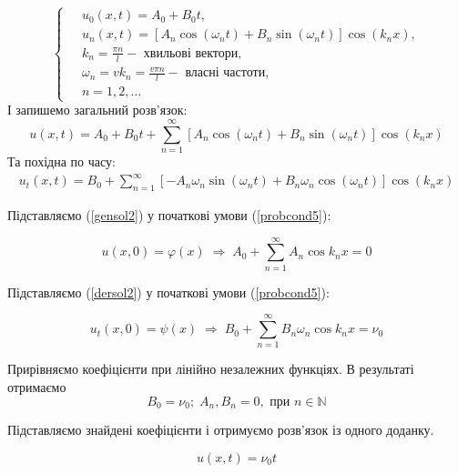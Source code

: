 \documentclass[a4paper, 14pt]{extreport}
\begin{document}
\begin{equation}
    \left\{ \begin{aligned} \label{fullsol2}
        \;&u_0(x,t) = A_0 + B_0 t, \\
        &u_n(x,t) = \left[A_n\cos(\omega_n t) + B_n\sin(\omega_n t)\right] \cos(k_n x), \\
        &k_n = \frac{\pi n}{l} - \text{ хвильові вектори}, \\
        &\omega_n = vk_n = \frac{v \pi n}{l} - \text{ власні частоти}, \\
        &n = 1, 2,\ldots
    \end{aligned}\right.
\end{equation}
І запишемо загальний розв'язок:
\begin{equation} \label{gensol2}
    u(x,t) = A_0 + B_0 t + \sum^{\infty}_{n=1} \left[A_n\cos(\omega_n t) + B_n\sin(\omega_n t)\right] \cos(k_n x)
\end{equation}
Та похідна по часу:
\begin{equation} \label{dersol2}
    \begin{aligned}
        u_t(x,t) = B_0 + \sum^{\infty}_{n=1}\left[-A_n\omega_n\sin(\omega_n t) + B_n\omega_n\cos(\omega_n t)\right] \cos(k_n x)  
    \end{aligned}
\end{equation}

Підставляємо (\ref{gensol2}) у початкові умови (\ref{probcond5}):

\begin{equation} \label{sol-init-pos}
    u(x,0) = \varphi(x) \;\Rightarrow\; A_0 + \sum^{\infty}_{n=1} A_n\cos k_nx = 0
\end{equation}


Підставляємо (\ref{dersol2}) у початкові умови (\ref{probcond5}):

\begin{equation} \label{sol-init-pos}
    u_t(x,0) = \psi(x) \;\Rightarrow\; B_0 + \sum^{\infty}_{n=1} B_n \omega_n \cos k_nx = \nu_0     
\end{equation}

Прирівняємо коефіцієнти при лінійно незалежних функціях. В результаті отримаємо  \[B_0 = \nu_0;\; A_n, B_n = 0, \text{ при } n \in \mathbb{N}\]

Підставляємо знайдені коефіцієнти і отримуємо розв'язок із одного доданку.

\begin{equation}
    u (x,t) = \nu_0 t 
\end{equation}
\end{document}
